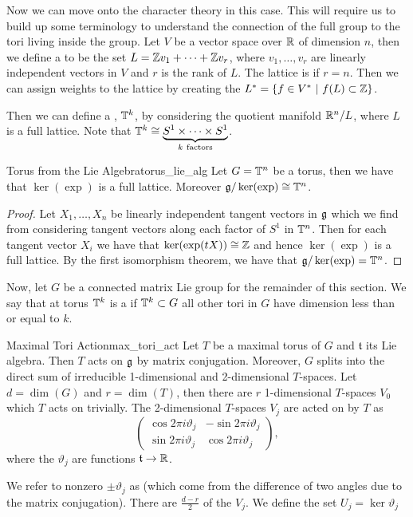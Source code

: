 Now we can move onto the character theory in this case.  This will require us to build up some terminology to understand the connection of the full group to the tori living inside the group. Let $V$ be a vector space over $\mathbb{R}$ of dimension $n$, then we define a  to be the set $L=\mathbb{Z} v_1+\cdots + \mathbb{Z} v_r$, where $v_1,\dots,v_r$ are linearly independent vectors in $V$ and $r$ is the rank of $L$.  The lattice is  if $r=n$. Then we can assign weights to the lattice by creating the  $L^*=\{f\in V^* ~\vert~ f(L)\subset \mathbb{Z}\}$. 

Then we can define a , $\mathbb{T}^k$, by considering the quotient manifold $\mathbb{R}^n/L$, where $L$ is a full lattice. Note that $\mathbb{T}^k \cong \underbrace{S^1\times \cdots \times S^1}_{k~\textrm{factors}}$. 

\begin{prop}{Torus from the Lie Algebra}{torus_lie_alg}
    Let $G=\mathbb{T}^n$ be a torus, then we have that $\ker(\exp)$ is a full lattice. Moreover $\mathfrak{g}/\ker(\exp)\cong \mathbb{T}^n$.
    \tcblower
    \begin{proof}
        Let $X_1,\dots,X_n$ be linearly independent tangent vectors in $\mathfrak{g}$ which we find from considering tangent vectors along each factor of $S^1$ in $\mathbb{T}^n$. Then for each tangent vector $X_i$ we have that $\ker(\exp(tX))\cong \mathbb{Z}$ and hence $\ker(\exp)$ is a full lattice. By the first isomorphism theorem, we have that $\mathfrak{g}/\ker(\exp)=\mathbb{T}^n$.
    \end{proof}
\end{prop}

Now, let $G$ be a connected matrix Lie group for the remainder of this section. We say that at torus $\mathbb{T}^k$ is a  if $\mathbb{T}^k\subset G$ all other tori in $G$ have dimension less than or equal to $k$.  

\begin{prop}{Maximal Tori Action}{max_tori_act}
    Let $T$ be a maximal torus of $G$ and $\mathfrak{t}$ its Lie algebra. Then $T$ acts on $\mathfrak{g}$ by matrix conjugation. Moreover, $G$ splits into the direct sum of irreducible 1-dimensional and 2-dimensional $T$-spaces. Let $d=\dim(G)$ and $r=\dim(T)$, then there are $r$ 1-dimensional $T$-spaces $V_0$ which $T$ acts on trivially. The 2-dimensional $T$-spaces $V_j$ are acted on by $T$ as
    \[
    \begin{pmatrix}
        \cos 2\pi i \vartheta_j & -\sin2\pi i \vartheta_j\\
        \sin 2\pi i \vartheta_j & \cos 2\pi i \vartheta_j
    \end{pmatrix},
    \]
    where the $\vartheta_j$ are functions $\mathfrak{t}\to \mathbb{R}$.
\end{prop}
We refer to nonzero $\pm\vartheta_j$ as  (which come from the difference of two angles due to the matrix conjugation).  There are $\frac{d-r}{2}$ of the $V_j$. We define the set $U_j = \ker\vartheta_j$

